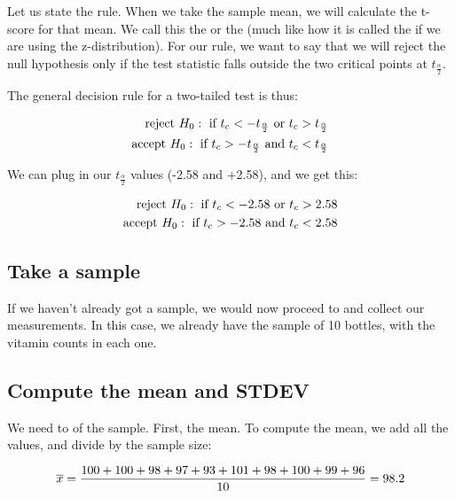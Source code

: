\documentclass[../../../main.tex]{subfiles}
\begin{document}
Let us state the rule. When we take the sample mean, we will calculate the t-score for that mean. We call this the  or the  (much like how it is called the  if we are using the z-distribution). For our rule, we want to say that we will reject the null hypothesis only if the test statistic falls outside the two critical points at $t_{\frac{\alpha}{2}}$.

The general decision rule for a two-tailed test is thus:

\begin{align*}
  \text{reject } \NullHyp/: \text{ if } t_{c} < -t_{\frac{\alpha}{2}} \text{ or } t_{c} > t_{\frac{\alpha}{2}} \\
  \text{accept } \NullHyp/: \text{ if } t_{c} > -t_{\frac{\alpha}{2}} \text{ and } t_{c} < t_{\frac{\alpha}{2}}
\end{align*}

\noindent
We can plug in our $t_{\frac{\alpha}{2}}$ values (-2.58 and +2.58), and we get this:

\begin{align*}
  \text{reject } \NullHyp/: \text{ if } t_{c} < -2.58 \text{ or } t_{c} > 2.58 \\
  \text{accept } \NullHyp/: \text{ if } t_{c} > -2.58 \text{ and } t_{c} < 2.58
\end{align*}


\subsection{Take a sample}

If we haven't already got a sample, we would now proceed to  and collect our measurements. In this case, we already have the sample of 10 bottles, with the vitamin counts in each one.


\subsection{Compute the mean and STDEV}

We need to  of the sample. First, the mean. To compute the mean, we add all the values, and divide by the sample size:

\begin{equation*}
  \overline{x} = \frac{100 + 100 + 98 + 97 + 93 + 101 + 98 + 100 + 99 + 96}{10} = 98.2
\end{equation*}
\end{document}
